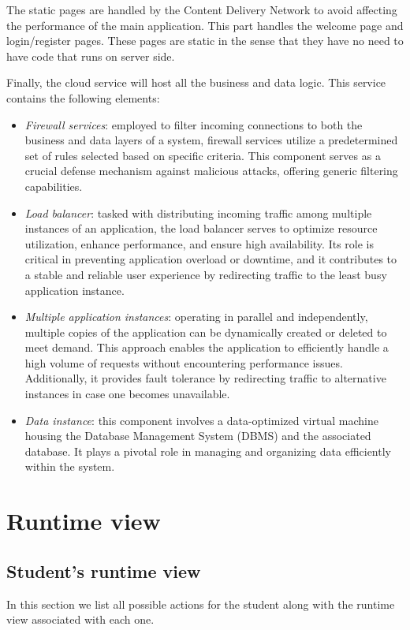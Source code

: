 \documentclass[12pt, a4paper]{report}
\begin{document}
    The static pages are handled by the Content Delivery Network to avoid affecting the performance of the main application. 
    This part handles the welcome page and login/register pages. 
    These pages are static in the sense that they have no need to have code that runs on server side. 

    Finally, the cloud service will host all the business and data logic. 
    This service contains the following elements: 
    \begin{itemize}
        \item \textit{Firewall services}: employed to filter incoming connections to both the business and data layers of a system, firewall services utilize a predetermined set of rules selected based on specific criteria. 
            This component serves as a crucial defense mechanism against malicious attacks, offering generic filtering capabilities.
        \item \textit{Load balancer}: tasked with distributing incoming traffic among multiple instances of an application, the load balancer serves to optimize resource utilization, enhance performance, and ensure high availability. 
            Its role is critical in preventing application overload or downtime, and it contributes to a stable and reliable user experience by redirecting traffic to the least busy application instance.
        \item \textit{Multiple application instances}: operating in parallel and independently, multiple copies of the application can be dynamically created or deleted to meet demand. 
            This approach enables the application to efficiently handle a high volume of requests without encountering performance issues. 
            Additionally, it provides fault tolerance by redirecting traffic to alternative instances in case one becomes unavailable.
        \item \textit{Data instance}: this component involves a data-optimized virtual machine housing the Database Management System (DBMS) and the associated database. 
            It plays a pivotal role in managing and organizing data efficiently within the system.
    \end{itemize}

    \section{Runtime view}
    \subsection{Student's runtime view}
    In this section we list all possible actions for the student along with the runtime view associated with each one. 
    
\end{document}
